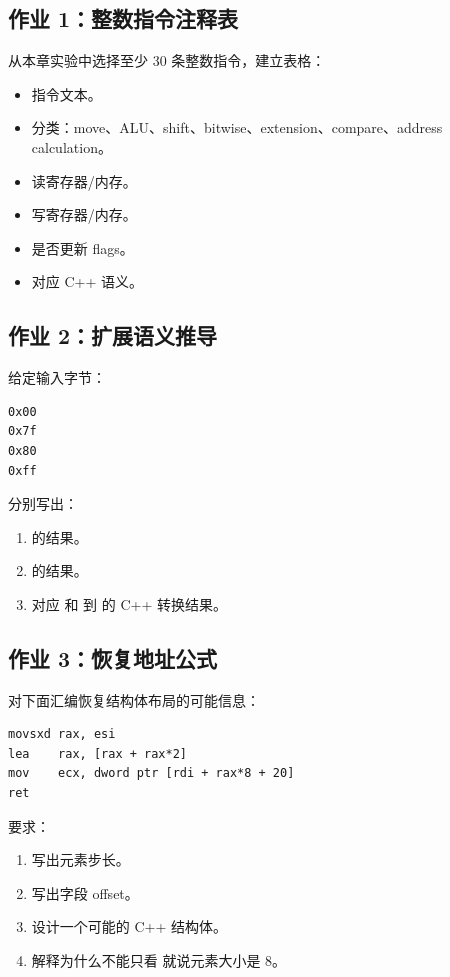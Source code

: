 \begin{exercisebox}
\subsection*{作业 1：整数指令注释表}

从本章实验中选择至少 30 条整数指令，建立表格：

\begin{itemize}
  \item 指令文本。
  \item 分类：move、ALU、shift、bitwise、extension、compare、address calculation。
  \item 读寄存器/内存。
  \item 写寄存器/内存。
  \item 是否更新 flags。
  \item 对应 C++ 语义。
\end{itemize}

\subsection*{作业 2：扩展语义推导}

给定输入字节：

\begin{lstlisting}
0x00
0x7f
0x80
0xff
\end{lstlisting}

分别写出：

\begin{enumerate}
  \item {} 的结果。
  \item {} 的结果。
  \item 对应  和  到  的 C++ 转换结果。
\end{enumerate}

\subsection*{作业 3：恢复地址公式}

对下面汇编恢复结构体布局的可能信息：

\begin{lstlisting}
movsxd rax, esi
lea    rax, [rax + rax*2]
mov    ecx, dword ptr [rdi + rax*8 + 20]
ret
\end{lstlisting}

要求：

\begin{enumerate}
  \item 写出元素步长。
  \item 写出字段 offset。
  \item 设计一个可能的 C++ 结构体。
  \item 解释为什么不能只看  就说元素大小是 8。
\end{enumerate}


\end{exercisebox}
